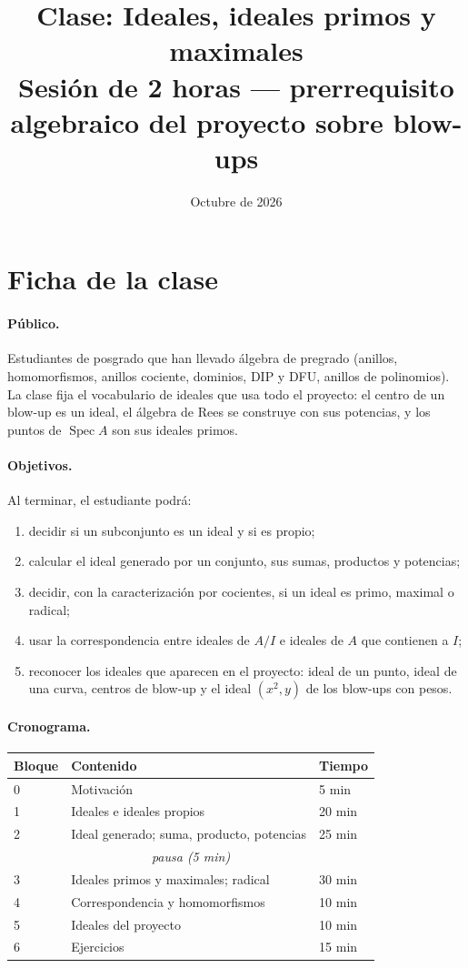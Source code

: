 \documentclass[11pt,a4paper]{article}
\title{\textbf{Clase: Ideales, ideales primos y maximales}\\[4pt]
\large Sesión de 2 horas --- prerrequisito algebraico del proyecto sobre blow-ups}
\author{}
\date{Octubre de 2026}
\newcommand{\Spec}{\operatorname{Spec}}
\theoremstyle{plain}
\theoremstyle{definition}
\theoremstyle{remark}
\begin{document}
\maketitle

\section*{Ficha de la clase}

\paragraph{Público.} Estudiantes de posgrado que han llevado álgebra de pregrado (anillos, homomorfismos, anillos cociente, dominios, DIP y DFU, anillos de polinomios). La clase fija el vocabulario de ideales que usa todo el proyecto: el centro de un blow-up es un ideal, el álgebra de Rees se construye con sus potencias, y los puntos de $\Spec A$ son sus ideales primos.

\paragraph{Objetivos.} Al terminar, el estudiante podrá:
\begin{enumerate}[itemsep=1pt]
\item decidir si un subconjunto es un ideal y si es propio;
\item calcular el ideal generado por un conjunto, sus sumas, productos y potencias;
\item decidir, con la caracterización por cocientes, si un ideal es primo, maximal o radical;
\item usar la correspondencia entre ideales de $A/I$ e ideales de $A$ que contienen a $I$;
\item reconocer los ideales que aparecen en el proyecto: ideal de un punto, ideal de una curva, centros de blow-up y el ideal $(x^2,y)$ de los blow-ups con pesos.
\end{enumerate}

\paragraph{Cronograma.}
\begin{center}
\begin{tabular}{@{}lll@{}}
\toprule
Bloque & Contenido & Tiempo \\
\midrule
0 & Motivación & 5 min \\
1 & Ideales e ideales propios & 20 min \\
2 & Ideal generado; suma, producto, potencias & 25 min \\
\multicolumn{3}{c}{\emph{pausa (5 min)}} \\
3 & Ideales primos y maximales; radical & 30 min \\
4 & Correspondencia y homomorfismos & 10 min \\
5 & Ideales del proyecto & 10 min \\
6 & Ejercicios & 15 min \\
\bottomrule
\end{tabular}
\end{center}
\end{document}

